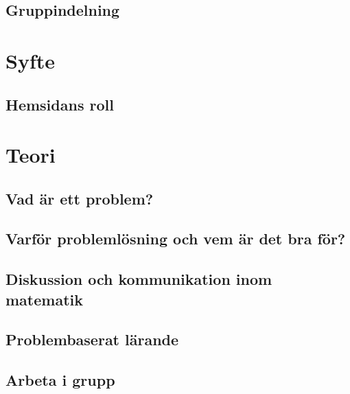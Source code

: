 \documentclass[11pt,a4paper]{article}
\begin{document}
    \subsection{Gruppindelning}
        \label{sec:Gruppindelning}
        

\section{Syfte}
    
    
    \subsection{Hemsidans roll}
        

\section{Teori}
    \label{sec:Teori}
    
    
    \subsection{Vad är ett problem?}
        
        
    \subsection{Varför problemlösning och vem är det bra för?}
        
        
    \subsection{Diskussion och kommunikation inom matematik}
        
        
    \subsection{Problembaserat lärande}
    
    
    \subsection{Arbeta i grupp}
        
        
\end{document}
